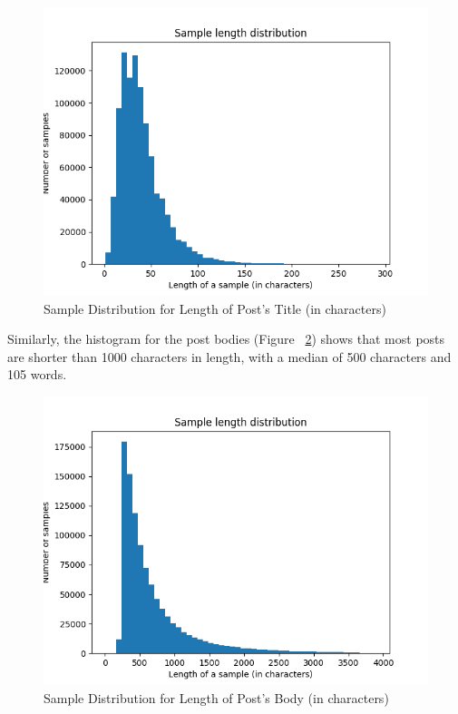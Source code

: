 \documentclass{sig-alternate-05-2015}
\begin{document}
\begin{figure}[H]
\centering
\includegraphics[width=\linewidth]{plots/sample-length-distribution-title-1000000.png}
\caption{Sample Distribution for Length of Post's Title (in characters)}
\label{fig:sampleLengthDistributionTitle}
\end{figure}

Similarly, the histogram for the post bodies (Figure ~\ref{fig:sampleLengthDistributionSelftext}) shows that most posts are shorter than 1000 characters in length, with a median of 500 characters and 105 words.

\begin{figure}[H]
\centering
\includegraphics[width=\linewidth]{plots/sample-length-distribution-selftext-1000000.png}
\caption{Sample Distribution for Length of Post's Body (in characters)}
\label{fig:sampleLengthDistributionSelftext}
\end{figure}
\end{document}
